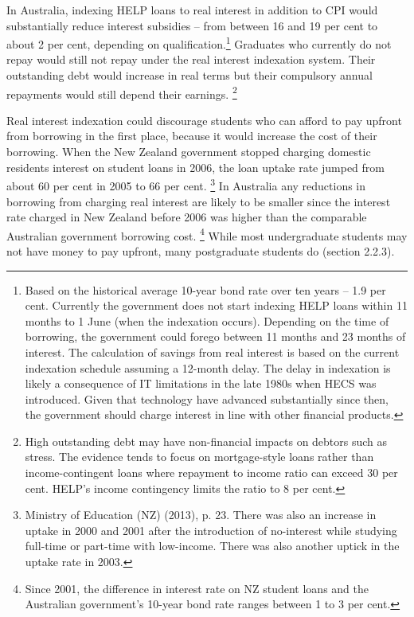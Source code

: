 \documentclass[embargoed]{grattan}
\begin{document}
In Australia, indexing \gls{HELP} loans to real interest in addition to \gls{CPI} would substantially reduce interest subsidies -- from between 16 and 19 per cent to about 2 per cent, depending on qualification.\protect\hypertarget{_Ref335647424}{}{}\footnote{Based on the historical average 10-year bond rate over ten years -- 1.9 per cent.
Currently the government does not start indexing \gls{HELP} loans within 11 months to 1 June (when the indexation occurs).
Depending on the time of borrowing, the government could forego between 11 months and 23 months of interest.
The calculation of savings from real interest is based on the current indexation schedule assuming a 12-month delay.
The delay in indexation is likely a consequence of IT limitations in the late 1980s when \gls{HECS} was introduced.
Given that technology have advanced substantially since then, the government should charge interest in line with other financial products.} Graduates who currently do not repay would still not repay under the real interest indexation system.
Their outstanding debt would increase in real terms but their compulsory annual repayments would still depend their earnings.%
\footnote{High outstanding debt may have non-financial impacts on debtors such as stress.
The evidence tends to focus on mortgage-style loans rather than income-contingent loans where repayment to income ratio can exceed 30 per cent.
\gls{HELP}'s income contingency limits the ratio to 8 per cent.}

Real interest indexation could discourage students who can afford to pay upfront from borrowing in the first place, because it would increase the cost of their borrowing.
When the New Zealand government stopped charging domestic residents interest on student loans in 2006, the loan uptake rate jumped from about 60 per cent in 2005 to 66 per cent.%
\footnote{Ministry of Education (NZ) (2013), p. 23.
There was also an increase in uptake in 2000 and 2001 after the introduction of no-interest while studying full-time or part-time with low-income.
There was also another uptick in the uptake rate in 2003.} In Australia any reductions in borrowing from charging real interest are likely to be smaller since the interest rate charged in New Zealand before 2006 was higher than the comparable Australian government borrowing cost.%
\footnote{Since 2001, the difference in interest rate on NZ student loans and the Australian government's 10-year bond rate ranges between 1 to 3 per cent.} While most undergraduate students may not have money to pay upfront, many postgraduate students do (section 2.2.3).
\end{document}
